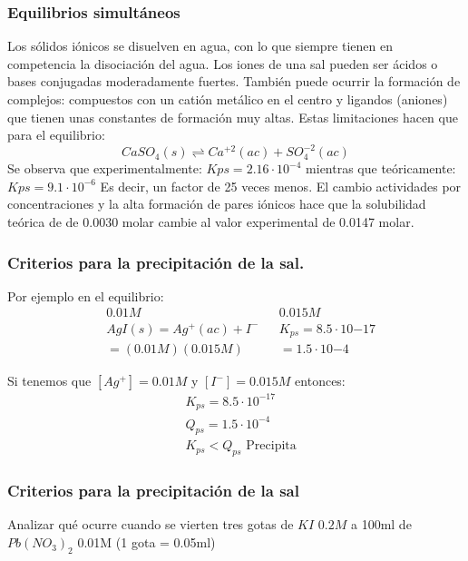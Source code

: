 \subsubsection{Equilibrios simultáneos}

Los sólidos iónicos se disuelven en agua, con lo que siempre tienen en
competencia la disociación del agua. Los iones de una sal pueden ser
ácidos o bases conjugadas moderadamente fuertes.
También puede ocurrir la formación de complejos: compuestos con un
catión metálico en el centro y ligandos (aniones) que tienen unas
constantes de formación muy altas.
Estas limitaciones hacen que para el equilibrio:
\begin{equation*}
	CaSO_4(s) \rightleftharpoons  Ca^{+2}(ac)+SO^{-2}_4(ac)
\end{equation*}
Se observa que experimentalmente: $Kps = 2.16 \cdot 10^{-4}$
mientras que teóricamente: $Kps = 9.1\cdot 10^{-6}$
Es decir, un factor de 25 veces menos. El cambio actividades por
concentraciones y la alta formación de pares iónicos hace que la
solubilidad teórica de de 0.0030 molar cambie al valor experimental
de 0.0147 molar.

\subsubsection{Criterios para la precipitación de la sal.}

Por ejemplo en el equilibrio:
\begin{align*}
	 & 0.01M                &  & 0.015M                  \\
	 & AgI(s)= Ag^+(ac)+I^- &  & K_{ps}=8.5\cdot 10{-17} \\
	 & =(0.01M)(0.015M)     &  & =1.5\cdot10{-4}
\end{align*}

Si tenemos que $[Ag^+]=0.01M$ y $[I^-]=0.015M$ entonces:
\begin{align*}
	 & K_{ps}=8.5\cdot 10^{-17}        \\
	 & Q_{ps}=1.5\cdot10^{-4}          \\
	 & K_{ps}<Q_{ps} \text{ Precipita}
\end{align*}
\subsubsection{Criterios para la precipitación de la sal}

Analizar qué ocurre cuando se vierten tres gotas de $KI$ $0.2M$
a 100ml de $Pb(NO_3)_2$ 0.01M (1 gota = 0.05ml)

